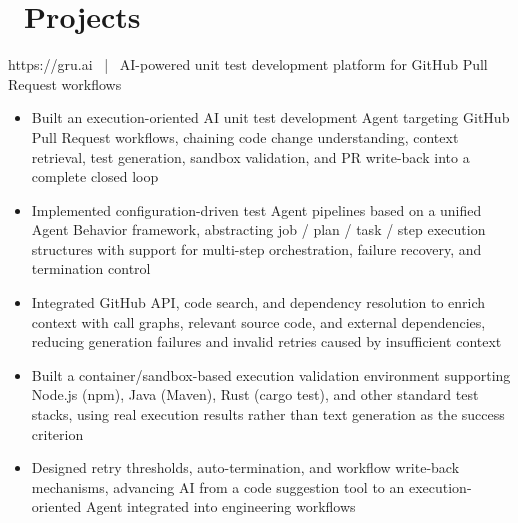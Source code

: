 \documentclass{resume}
\begin{document}
\section{\faUsers\ Projects}

https://gru.ai \ | \ AI-powered unit test development platform for GitHub Pull Request workflows
\begin{onehalfspacing}
\begin{itemize}
  \item Built an execution-oriented AI unit test development Agent targeting GitHub Pull Request workflows, chaining code change understanding, context retrieval, test generation, sandbox validation, and PR write-back into a complete closed loop
  \item Implemented configuration-driven test Agent pipelines based on a unified Agent Behavior framework, abstracting job / plan / task / step execution structures with support for multi-step orchestration, failure recovery, and termination control
  \item Integrated GitHub API, code search, and dependency resolution to enrich context with call graphs, relevant source code, and external dependencies, reducing generation failures and invalid retries caused by insufficient context
  \item Built a container/sandbox-based execution validation environment supporting Node.js (npm), Java (Maven), Rust (cargo test), and other standard test stacks, using real execution results rather than text generation as the success criterion
  \item Designed retry thresholds, auto-termination, and workflow write-back mechanisms, advancing AI from a code suggestion tool to an execution-oriented Agent integrated into engineering workflows
\end{itemize}
\end{onehalfspacing}
\end{document}

